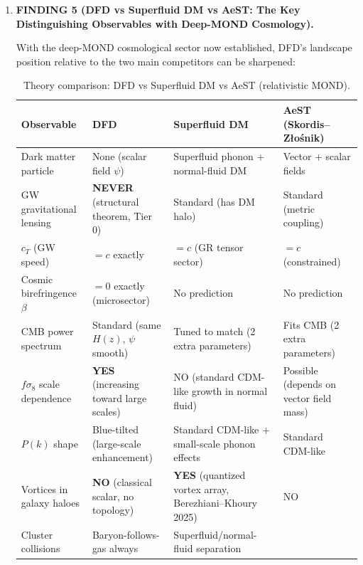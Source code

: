 \documentclass[11pt]{article}
\begin{document}
\begin{tcolorbox}[colback=blue!5!white, colframe=blue!70!black,
  title=\textbf{TOP 5 FINDINGS (Ranked by Impact on DFD Programme)}]
\begin{enumerate}
  \textbf{The SHARPEST near-term prediction is NOT $\sigma_8$ but
  the scale-dependence of $f\sigma_8$} (Finding 1).  The qualitative
  sign of the scale-dependence is robust and model-independent within
  the DFD framework.

\item \textbf{FINDING 5 (DFD vs Superfluid DM vs AeST: The Key
  Distinguishing Observables with Deep-MOND Cosmology).}

  With the deep-MOND cosmological sector now established, DFD's
  landscape position relative to the two main competitors can be
  sharpened:

  \begin{table}[h]
  \centering
  \caption{Theory comparison: DFD vs Superfluid DM vs AeST (relativistic MOND).}
  \small
  \begin{tabular}{p{3.2cm}p{3.5cm}p{3.5cm}p{3.5cm}}
  \toprule
  \textbf{Observable} & \textbf{DFD} & \textbf{Superfluid DM}
    & \textbf{AeST (Skordis--Z\l{}o\'snik)} \\
  \midrule
  Dark matter particle & None (scalar field $\psi$)
    & Superfluid phonon + normal-fluid DM
    & Vector + scalar fields \\[3pt]
  GW gravitational lensing
    & \textbf{NEVER} (structural theorem, Tier 0)
    & Standard (has DM halo)
    & Standard (metric coupling) \\[3pt]
  $c_T$ (GW speed) & $= c$ exactly
    & $= c$ (GR tensor sector)
    & $= c$ (constrained) \\[3pt]
  Cosmic birefringence $\beta$
    & $= 0$ exactly (microsector)
    & No prediction
    & No prediction \\[3pt]
  CMB power spectrum
    & Standard (same $H(z)$, $\psi$ smooth)
    & Tuned to match (2 extra parameters)
    & Fits CMB (2 extra parameters) \\[3pt]
  $f\sigma_8$ scale dependence
    & \textbf{YES} (increasing toward large scales)
    & NO (standard CDM-like growth in normal fluid)
    & Possible (depends on vector field mass) \\[3pt]
  $P(k)$ shape
    & Blue-tilted (large-scale enhancement)
    & Standard CDM-like + small-scale phonon effects
    & Standard CDM-like \\[3pt]
  Vortices in galaxy haloes
    & \textbf{NO} (classical scalar, no topology)
    & \textbf{YES} (quantized vortex array, Berezhiani--Khoury 2025)
    & NO \\[3pt]
  Cluster collisions
    & Baryon-follows-gas always
    & Superfluid/normal-fluid separation

\end{tabular}
\end{table}
\end{enumerate}
\end{tcolorbox}
\end{document}
